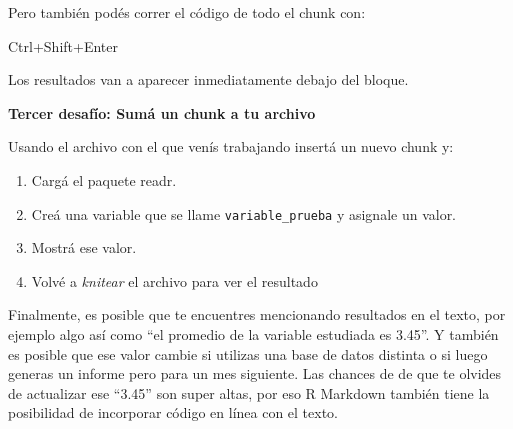 \documentclass[
  letterpaper,
  DIV=11,
  numbers=noendperiod]{scrartcl}
\providecommand{\tightlist}{%
  \setlength{\itemsep}{0pt}\setlength{\parskip}{0pt}}\usepackage{longtable,booktabs,array}
\begin{document}
Pero también podés correr el código de todo el chunk con:

\begin{tcolorbox}[enhanced jigsaw, arc=.35mm, title=\textcolor{quarto-callout-note-color}{\faInfo}\hspace{0.5em}{Instrucciones}, coltitle=black, bottomrule=.15mm, breakable, colbacktitle=quarto-callout-note-color!10!white, bottomtitle=1mm, opacityback=0, toptitle=1mm, left=2mm, opacitybacktitle=0.6, rightrule=.15mm, toprule=.15mm, colback=white, colframe=quarto-callout-note-color-frame, leftrule=.75mm, titlerule=0mm]
Ctrl+Shift+Enter
\end{tcolorbox}

Los resultados van a aparecer inmediatamente debajo del bloque.

\begin{tcolorbox}[enhanced jigsaw, arc=.35mm, title=\textcolor{quarto-callout-tip-color}{\faLightbulb}\hspace{0.5em}{Ejercicio}, coltitle=black, bottomrule=.15mm, breakable, colbacktitle=quarto-callout-tip-color!10!white, bottomtitle=1mm, opacityback=0, toptitle=1mm, left=2mm, opacitybacktitle=0.6, rightrule=.15mm, toprule=.15mm, colback=white, colframe=quarto-callout-tip-color-frame, leftrule=.75mm, titlerule=0mm]

\textbf{Tercer desafío: Sumá un chunk a tu archivo}

Usando el archivo con el que venís trabajando insertá un nuevo chunk y:

\begin{enumerate}
\def\labelenumi{\arabic{enumi}.}
\tightlist
\item
  Cargá el paquete readr.
\item
  Creá una variable que se llame \texttt{variable\_prueba} y asignale un
  valor.
\item
  Mostrá ese valor.
\item
  Volvé a \emph{knitear} el archivo para ver el resultado
\end{enumerate}

\end{tcolorbox}

Finalmente, es posible que te encuentres mencionando resultados en el
texto, por ejemplo algo así como ``el promedio de la variable estudiada
es 3.45''. Y también es posible que ese valor cambie si utilizas una
base de datos distinta o si luego generas un informe pero para un mes
siguiente. Las chances de de que te olvides de actualizar ese ``3.45''
son super altas, por eso R Markdown también tiene la posibilidad de
incorporar código en línea con el texto.
\end{document}
